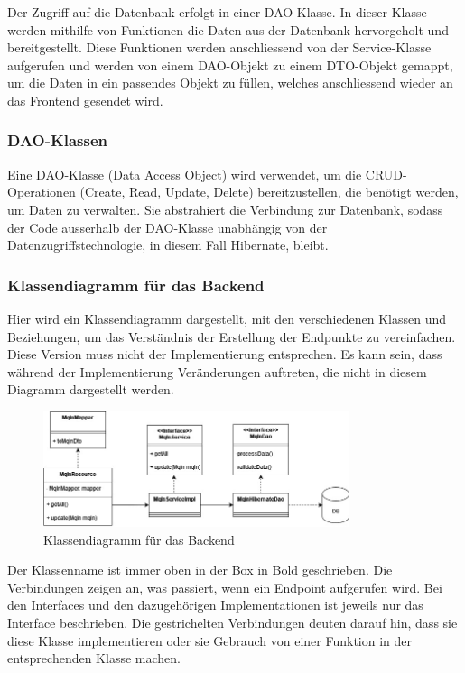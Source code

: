 Der Zugriff auf die Datenbank erfolgt in einer DAO-Klasse. In dieser Klasse werden mithilfe von Funktionen die Daten aus der Datenbank hervorgeholt und bereitgestellt. Diese Funktionen werden anschliessend von der Service-Klasse aufgerufen und werden von einem DAO-Objekt zu einem DTO-Objekt gemappt, um die Daten in ein passendes Objekt zu füllen, welches anschliessend wieder an das Frontend gesendet wird.

\subsubsection{DAO-Klassen}
Eine DAO-Klasse (Data Access Object) wird verwendet, um die CRUD-Operationen (Create, Read, Update, Delete) bereitzustellen, die benötigt werden, um Daten zu verwalten. Sie abstrahiert die Verbindung zur Datenbank, sodass der Code ausserhalb der DAO-Klasse unabhängig von der Datenzugriffstechnologie, in diesem Fall Hibernate, bleibt.

\subsubsection{Klassendiagramm für das Backend}
Hier wird ein Klassendiagramm dargestellt, mit den verschiedenen Klassen und Beziehungen, um das Verständnis der Erstellung der Endpunkte zu vereinfachen. Diese Version muss nicht der Implementierung entsprechen. Es kann sein, dass während der Implementierung Veränderungen auftreten, die nicht in diesem Diagramm dargestellt werden.

\begin{figure}[H]
	\begin{center}
		\includegraphics[width=0.8\textwidth]{ressourcen/Klassendiagramm-Backend}
		\caption[Klassendiagramm für das Backend]{Klassendiagramm für das Backend}\label{fig:klassendiagramm-backend}
	\end{center}
\end{figure}

\noindent Der Klassenname ist immer oben in der Box in Bold geschrieben. Die Verbindungen zeigen an, was passiert, wenn ein Endpoint aufgerufen wird. Bei den Interfaces und den dazugehörigen Implementationen ist jeweils nur das Interface beschrieben. Die gestrichelten Verbindungen deuten darauf hin, dass sie diese Klasse implementieren oder sie Gebrauch von einer Funktion in der entsprechenden Klasse machen.

